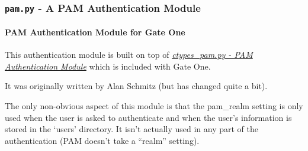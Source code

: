 \documentclass[letterpaper,10pt,openany]{sphinxmanual}
\begin{document}
\subsubsection{\texttt{pam.py} - A PAM Authentication Module}
\label{Developer/pam:module-gateone.auth.pam}\label{Developer/pam::doc}\label{Developer/pam:pam-py-a-pam-authentication-module}

\paragraph{PAM Authentication Module for Gate One}
\label{Developer/pam:pam-py}\label{Developer/pam:pam-authentication-module-for-gate-one}
This authentication module is built on top of {\hyperref[Developer/ctypes_pam:ctypes-pam]{\emph{ctypes\_pam.py - PAM Authentication Module}}} which is
included with Gate One.

It was originally written by Alan Schmitz (but has changed quite a bit).

The only non-obvious aspect of this module is that the pam\_realm setting is only
used when the user is asked to authenticate and when the user's information is
stored in the `users' directory.  It isn't actually used in any part of the
authentication (PAM doesn't take a ``realm'' setting).
\end{document}
